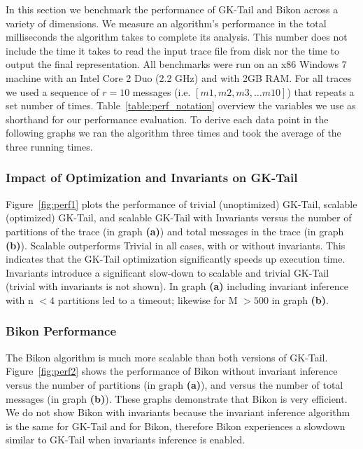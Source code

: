 In this section we benchmark the performance of GK-Tail and Bikon
across a variety of dimensions. We measure an algorithm's performance
in the total milliseconds the algorithm takes to complete its
analysis. This number does not include the time it takes to read the
input trace file from disk nor the time to output the final
representation. All benchmarks were run on an x86 Windows 7 machine
with an Intel Core 2 Duo (2.2 GHz) and with 2GB RAM. For all traces we
used a sequence of $r=10$ messages (i.e. $[m1, m2, m3, \dots m10 ]$) that repeats a set
number of times. Table~\ref{table:perf_notation} overview the
variables we use as shorthand for our performance evaluation. To
derive each data point in the following graphs we ran the algorithm
three times and took the average of the three running times.

\subsubsection{Impact of Optimization and Invariants on GK-Tail}

Figure~\ref{fig:perf1} plots the performance of trivial (unoptimized)
GK-Tail, scalable (optimized) GK-Tail, and scalable GK-Tail with
Invariants versus the number of partitions of the trace (in graph
\textbf{(a)}) and total messages in the trace (in graph
\textbf{(b)}). Scalable outperforms Trivial in all cases, with or
without invariants. This indicates that the GK-Tail optimization
significantly speeds up execution time. Invariants introduce a
significant slow-down to scalable and trivial GK-Tail (trivial with
invariants is not shown).  In graph \textbf{(a)} including invariant
inference with n $< 4$ partitions led to a timeout; likewise for M $>
500$ in graph \textbf{(b)}.

\subsubsection{Bikon Performance}

The Bikon algorithm is much more scalable than both versions of
GK-Tail. Figure~\ref{fig:perf2} shows the performance of Bikon without
invariant inference versus the number of partitions (in graph
\textbf{(a)}), and versus the number of total messages (in graph
\textbf{(b)}). These graphs demonstrate that Bikon is very
efficient. We do not show Bikon with invariants because the invariant
inference algorithm is the same for GK-Tail and for Bikon, therefore
Bikon experiences a slowdown similar to GK-Tail when invariants
inference is enabled.


